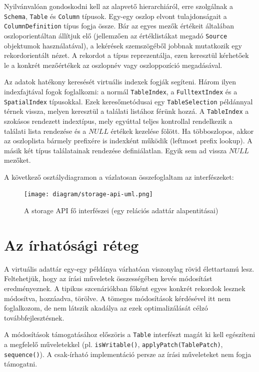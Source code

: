 \documentclass[
    parspace,
    noindent,
    nohyp,
]{elteiktdk}[2023/04/10]
\begin{document}
Nyilvánvalóan gondoskodni kell az alapvető hierarchiáról,
erre szolgálnak a \texttt{Schema}, \texttt{Table} és \texttt{Column} típusok.
Egy-egy oszlop elvont tulajdonságait a \texttt{ColumnDefinition} típus fogja össze.
Bár az egyes mezők értékeit általában oszloporientáltan állítjuk elő
(jellemzően az értéklistákat megadó \texttt{Source} objektumok használatával),
a lekérések szemszögéből jobbnak mutatkozik egy rekordorientált nézet.
A rekordot a  típus reprezentálja,
ezen keresztül kérhetőek le a konkrét mezőértékek
az oszlopnév vagy oszloppozíció megadásával.

Az adatok hatékony keresését virtuális indexek fogják segíteni.
Három ilyen indexfajtával fogok foglalkozni:
a normál \texttt{TableIndex}, a \texttt{FulltextIndex} és a \texttt{SpatialIndex} típusokkal.
Ezek keresőmetódusai egy \texttt{TableSelection} példánnyal térnek vissza,
melyen keresztül a találati listához férünk hozzá.
A \texttt{TableIndex} a szokásos rendezett indextípus,
mely egyúttal teljes kontrollal rendelkezik a találati lista rendezése
és a $NULL$ értékek kezelése fölött.
Ha többoszlopos, akkor az oszloplista bármely prefixére is indexként működik (leftmost prefix lookup\cite{MysqlMultipleColumnIndexes}).
A másik két típus találatainak rendezése definiálatlan.
Egyik sem ad vissza $NULL$ mezőket.

A következő osztálydiagramon a vázlatosan összefoglaltam az interfészeket:

\begin{figure}[H]
\centering
\texttt{[image: diagram/storage-api-uml.png]}
\caption{A storage API fő interfészei (egy relációs adattár alapentitásai)}
\end{figure}


\section{Az írhatósági réteg}

A virtuális adattár egy-egy példánya várhatóan viszonylag rövid élettartamú lesz.
Feltehetjük, hogy az írási műveletek összességében kevés módosítást eredményeznek.
A tipikus szcenáriókban főként egyes konkrét rekordok lesznek módosítva, hozzáadva, törölve.
A tömeges módosítások kérdésével itt nem foglalkozom,
de nem látszik akadálya az ezek optimalizálását célzó továbbfejlesztésnek.

A módosítások támogatásához előszöris a \texttt{Table} interfészt magát
ki kell egészíteni a megfelelő műveletekkel
(pl. \texttt{isWritable()}, \texttt{applyPatch(TablePatch)}, \texttt{sequence()}).
A csak-írható implementáció persze az írási műveleteket nem fogja támogatni.
\end{document}
